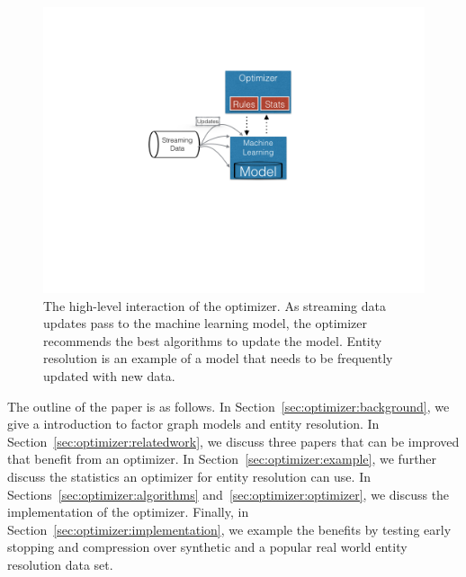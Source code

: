 \begin{figure}
\centering
\includegraphics[width=\columnwidth, clip=true, trim= 25em 30em 30em 17em]{media/optimizer/optimizer.png}
\caption{The high-level interaction of the optimizer. As streaming data updates pass to the machine learning model, the optimizer recommends the best algorithms to update the model. Entity resolution is an example of a model that needs to be frequently updated with new data.}
\label{fig:optimizer-arch}
\end{figure}


The outline of the paper is as follows.
In Section~\ref{sec:optimizer:background}, we give a introduction to factor graph models and entity resolution.
In Section~\ref{sec:optimizer:relatedwork}, we discuss three papers that can be improved that benefit from an optimizer.
In Section~\ref{sec:optimizer:example}, we further discuss the statistics an optimizer for entity resolution can use.
In Sections~\ref{sec:optimizer:algorithms} and~\ref{sec:optimizer:optimizer}, we discuss the implementation of the optimizer.
Finally, in Section~\ref{sec:optimizer:implementation}, we example 
the benefits by testing early stopping and compression over synthetic and a popular real world entity resolution data set.



